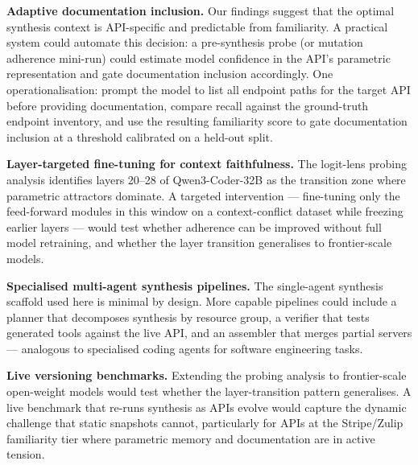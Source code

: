 \textbf{Adaptive documentation inclusion.} Our findings suggest that the optimal synthesis context is API-specific and predictable from familiarity. A practical system could automate this decision: a pre-synthesis probe (or mutation adherence mini-run) could estimate model confidence in the API's parametric representation and gate documentation inclusion accordingly. One operationalisation: prompt the model to list all endpoint paths for the target API before providing documentation, compare recall against the ground-truth endpoint inventory, and use the resulting familiarity score to gate documentation inclusion at a threshold calibrated on a held-out split.

\textbf{Layer-targeted fine-tuning for context faithfulness.} The logit-lens probing analysis identifies layers 20--28 of Qwen3-Coder-32B as the transition zone where parametric attractors dominate. A targeted intervention --- fine-tuning only the feed-forward modules in this window on a context-conflict dataset while freezing earlier layers --- would test whether adherence can be improved without full model retraining, and whether the layer transition generalises to frontier-scale models.

\textbf{Specialised multi-agent synthesis pipelines.} The single-agent synthesis scaffold used here is minimal by design. More capable pipelines could include a planner that decomposes synthesis by resource group, a verifier that tests generated tools against the live API, and an assembler that merges partial servers --- analogous to specialised coding agents for software engineering tasks.

\textbf{Live versioning benchmarks.} Extending the probing analysis to frontier-scale open-weight models would test whether the layer-transition pattern generalises. A live benchmark that re-runs synthesis as APIs evolve would capture the dynamic challenge that static snapshots cannot, particularly for APIs at the Stripe/Zulip familiarity tier where parametric memory and documentation are in active tension.

